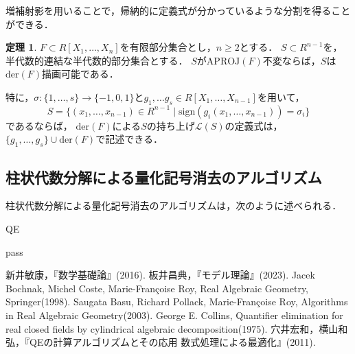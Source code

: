 \documentclass[uplatex, dvipdfmx]{jsarticle}
\newcommand{\calL}{\mathcal{L}}
\newcommand{\APROJ}{\mathrm{APROJ}}
\newcommand{\der}{\mathrm{der}}
\newcommand{\sign}{\mathrm{sign}}
\newcommand{\map}[3]{{#1}:{#2}\rightarrow{#3}}
\theoremstyle{definition}
\newtheorem{theorem}{定理}[section]
\begin{document}
増補射影を用いることで，帰納的に定義式が分かっているような分割を得ることができる．

\begin{theorem}
     $F \subset R[X_1, \dots, X_n]$を有限部分集合とし，$n \geq 2$とする．
     $S \subset R^{n-1}$を，半代数的連結な半代数的部分集合とする．
     $S$が$\APROJ(F)$不変ならば，$S$は$\der(F)$描画可能である．

     特に，$\map{\sigma}{\{1,\dots, s\}}{\{-1, 0, 1\}}$と$g_1, \dots g_s \in R[X_1, \dots, X_{n-1}]$を用いて，
     \[
          S = \{(x_1, \dots, x_{n-1}) \in R^{n-1} \mid \sign(g_i(x_1, \dots, x_{n-1}))= \sigma_i\}
     \]
     であるならば，
     $\der(F)$による$S$の持ち上げ$\calL(S)$の定義式は，$\{g_1, \dots,g_s\} \cup \der(F)$で記述できる．
\end{theorem}

\subsection{柱状代数分解による量化記号消去のアルゴリズム}

柱状代数分解による量化記号消去のアルゴリズムは，次のように述べられる．

\begin{algorithm}
     \caption{QE}
     \begin{algorithmic}[1]
     \REQUIRE 
     \ENSURE 
     \STATE pass
     \end{algorithmic}
\end{algorithm}

\begin{thebibliography}{99}
      新井敏康，『数学基礎論』(2016).
      板井昌典，『モデル理論』(2023).
     Jacek Bochnak, Michel Coste, Marie-Fran\c{c}oise Roy, Real Algebraic Geometry, Springer(1998).
      Saugata Basu, Richard Pollack, Marie-Fran\c{c}oise Roy, Algorithms in Real Algebraic Geometry(2003).
      George E. Collins, Quantifier elimination for real closed fields by cylindrical algebraic decomposition(1975).
      穴井宏和，横山和弘，『QEの計算アルゴリズムとその応用 数式処理による最適化』(2011).
\end{thebibliography}
\end{document}
